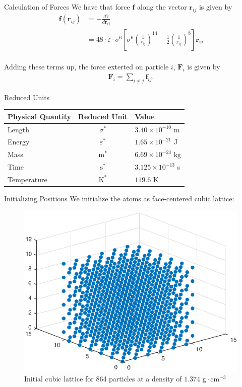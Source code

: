 \documentclass{beamer}
\renewcommand{\vec}[1]{\mathbf{#1}}
\begin{document}
\begin{frame}{Calculation of Forces}
We have that force $\vec{f}$ along the vector $\vec{r}_{ij}$ is given by
\begin{align*}
\vec{f}\left(\vec{r}_{ij}\right) &= -\frac{dV}{d\vec{r}_{ij}} \\
&=48\cdot \varepsilon \cdot \sigma^{6}\left[ \sigma^{6}\left( \frac{1}{r_{ij}}\right)^{14} - \frac{1}{2}\left( \frac{1}{r_{ij}}\right)^{8}\right]\vec{r}_{ij}
\end{align*} \\
\medskip
Adding these terms up, the force exterted on particle $i$, $\vec{F}_{i}$ is given by
\begin{align*}
	\vec{F}_{i} = \sum_{i \neq j} \vec{f}_{ij}.
\end{align*}
\end{frame}

\begin{frame}{Reduced Units}
\begin{table}
	\centering
	\begin{tabular}{ |l|c|l| }
		\hline
		Physical Quantity & Reduced Unit & Value \\
		\hline
		Length & $\sigma^{*}$ & $3.40 \times 10^{-10}$ m \\
		Energy & $\varepsilon^{*}$ & $1.65 \times 10^{-21}$ J \\
		Mass & $\mbox{m}^{*}$ & $ 6.69 \times 10^{-23}$ kg\\
		Time & $\mbox{s}^{*}$ & $3.125 \times 10^{-13}$ s \\
		Temperature & $\mbox{K}^{*}$ & $119.6$ K \\
		\hline
	\end{tabular}
\end{table}
\end{frame}

\begin{frame}{Initializing Positions}
We initialize the atoms as face-centered cubic lattice:
 \begin{figure}
	\centering
	\includegraphics[scale=0.5]{fcc_lattice_-40_25.eps}
  	\caption{Initial cubic lattice for 864 particles at a density of $1.374 \mbox{ g}\cdot\mbox{cm}^{-3}$}
	\label{fig:initial_cubic_lattice}
\end{figure}
\end{frame}
\end{document}
